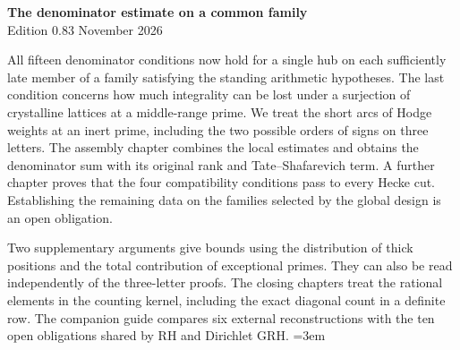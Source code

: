 \begin{center}
{\Large\bfseries The denominator estimate on a common family}\\[4pt]
Edition 0.83  November 2026
\end{center}

All fifteen denominator conditions now hold for a single hub on
each sufficiently late member of a family satisfying the standing
arithmetic hypotheses. The last condition concerns how much
integrality can be lost under a surjection of crystalline lattices
at a middle-range prime. We treat the short arcs of Hodge weights
at an inert prime, including the two possible orders of signs on
three letters. The assembly chapter combines the local estimates
and obtains the denominator sum with its original rank and
Tate--Shafarevich term. A further chapter proves that the four compatibility conditions
pass to every Hecke cut. Establishing the remaining data on the
families selected by the global design is an open obligation.

Two supplementary arguments give bounds using the distribution of
thick positions and the total contribution of exceptional primes.
They can also be read independently of the three-letter proofs.
The closing chapters treat the rational elements in the counting
kernel, including the exact diagonal count in a definite row.
The companion guide compares six external reconstructions with
the ten open obligations shared by RH and Dirichlet GRH.
\begingroup\emergencystretch=3em















\endgroup
